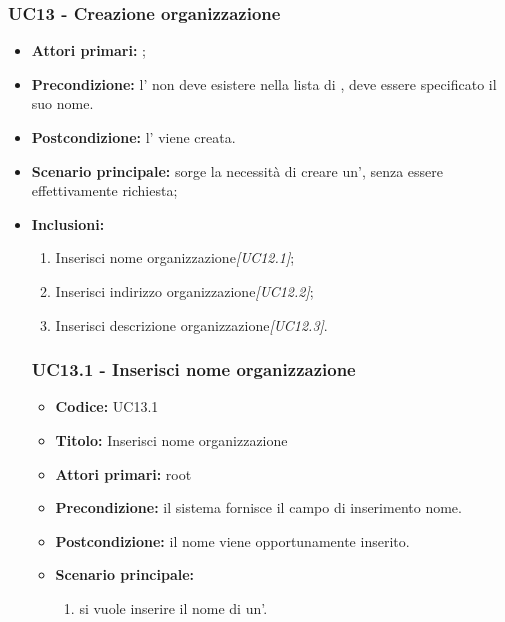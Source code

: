 \documentclass[casi-duso]{subfiles}
\begin{document}
\subsubsection{UC13 - Creazione organizzazione}
\label{subsub:UC13}
\begin{itemize}
  \item \textbf{Attori primari:} ;
  \item \textbf{Precondizione:} l' non deve esistere nella lista di , deve essere specificato il suo nome.
  \item \textbf{Postcondizione:} l' viene creata.
  \item \textbf{Scenario principale:} sorge la necessità di creare un', senza essere effettivamente richiesta;
  \item \textbf{Inclusioni:}
  \begin{enumerate}
    \item Inserisci nome organizzazione\emph{[UC12.1]};
    \item Inserisci indirizzo organizzazione\emph{[UC12.2]};
    \item Inserisci descrizione organizzazione\emph{[UC12.3]}.
  \end{enumerate}


  \subsubsection{UC13.1 - Inserisci nome organizzazione}
  \label{subsub:UC13.1}
  \begin{itemize}
    \item \textbf{Codice:} UC13.1
    \item \textbf{Titolo:} Inserisci nome organizzazione
    \item \textbf{Attori primari:} root
    \item \textbf{Precondizione:} il sistema fornisce il campo di inserimento nome.
    \item \textbf{Postcondizione:} il nome viene opportunamente inserito.
    \item \textbf{Scenario principale:} 
    \begin{enumerate}
      \item si vuole inserire il nome di un'.
    \end{enumerate}
    
  \end{itemize}
  

\end{itemize}
\end{document}
